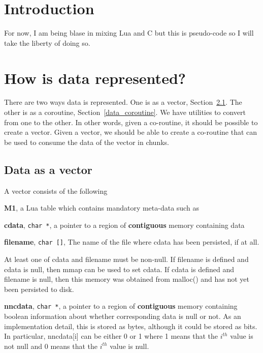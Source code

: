 \newcommand{\Assign}{\verb+:=+ }

\section{Introduction}

For now, I am being blase in mixing Lua and C but this is pseudo-code 
so I will take the liberty of doing so.

\TBC


\section{How is data represented?}
There are two ways data is represented. One is as a vector,
Section~\ref{data_vector}. The other is as a coroutine,
Section~\ref{data_coroutine}. We have utilities to convert from one to
the other. In other words, given a co-routine, it should be possible
to create a vector. Given a vector, we should be able to create a
co-routine that can be used to consume the data of the vector in
chunks.

\subsection{Data as a vector}
\label{data_vector}

A vector consists of the following
\be
\item {\bf M1}, a Lua table which contains mandatory meta-data such as 
\be
\item {\bf cdata}, \verb+char *+, a pointer to a region of {\bf contiguous} memory
containing data 
\item {\bf filename}, \verb+char []+, The name of the file where cdata has been
persisted, if at all. 

At least one of cdata and filename must be non-null.
If filename is defined and cdata is null, then mmap can be used to set cdata. If
cdata is defined and filename is null, then this memory was obtained from
malloc()
and has not yet been persisted to disk.
\item {\bf nncdata}, \verb+char *+, a pointer to a region of {\bf contiguous} memory
containing boolean information about whether corresponding data is null or not.
As an implementation detail, this is stored as bytes, although it could be
stored as bits. In particular, nncdata[i] can be either 0 or 1 where 
1 means that the \(i^{th}\) value is not null and 
0 means that the \(i^{th}\) value is null. 

